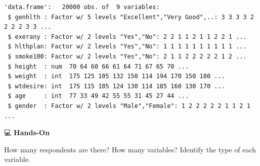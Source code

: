 \documentclass[
  letterpaper,
  DIV=11,
  numbers=noendperiod]{scrreprt}
\begin{document}
\begin{tcolorbox}
\begin{verbatim}
'data.frame':   20000 obs. of  9 variables:
 $ genhlth : Factor w/ 5 levels "Excellent","Very Good",..: 3 3 3 3 2 2 2 2 3 3 ...
 $ exerany : Factor w/ 2 levels "Yes","No": 2 2 1 1 2 1 1 2 2 1 ...
 $ hlthplan: Factor w/ 2 levels "Yes","No": 1 1 1 1 1 1 1 1 1 1 ...
 $ smoke100: Factor w/ 2 levels "Yes","No": 2 1 1 2 2 2 2 2 1 2 ...
 $ height  : num  70 64 60 66 61 64 71 67 65 70 ...
 $ weight  : int  175 125 105 132 150 114 194 170 150 180 ...
 $ wtdesire: int  175 115 105 124 130 114 185 160 130 170 ...
 $ age     : int  77 33 49 42 55 55 31 45 27 44 ...
 $ gender  : Factor w/ 2 levels "Male","Female": 1 2 2 2 2 2 1 1 2 1 ...
\end{verbatim}

\end{tcolorbox}

💻 \textbf{Hands-On}

How many respondents are there? How many variables? Identify the type of
each variable.
\end{document}
